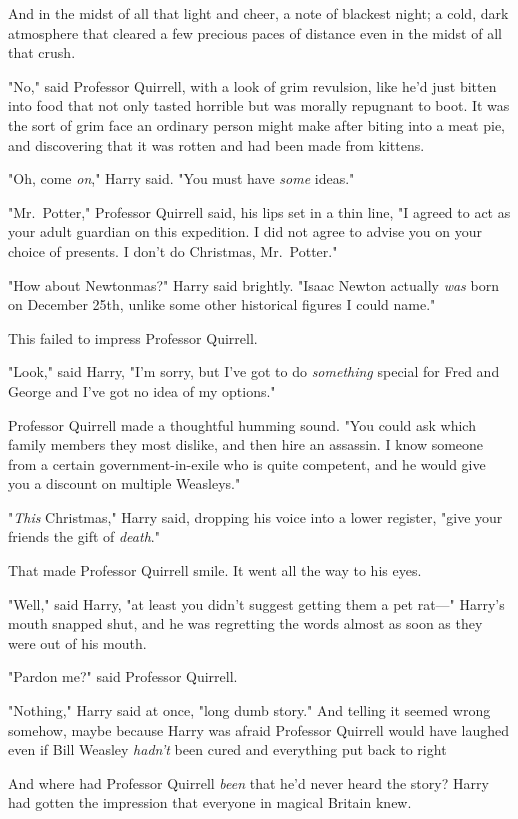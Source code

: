 And in the midst of all that light and cheer, a note of blackest night; a cold,
dark atmosphere that cleared a few precious paces of distance even in the midst
of all that crush.

"No," said Professor Quirrell, with a look of grim revulsion, like he'd just
bitten into food that not only tasted horrible but was morally repugnant to
boot. It was the sort of grim face an ordinary person might make after biting
into a meat pie, and discovering that it was rotten and had been made from
kittens.

"Oh, come \emph{on}," Harry said. "You must have \emph{some} ideas."

"Mr.~Potter," Professor Quirrell said, his lips set in a thin line, "I agreed
to act as your adult guardian on this expedition. I did not agree to advise you
on your choice of presents. I don't do Christmas, Mr.~Potter."

"How about Newtonmas?" Harry said brightly. "Isaac Newton actually \emph{was}
born on December 25th, unlike some other historical figures I could name."

This failed to impress Professor Quirrell.

"Look," said Harry, "I'm sorry, but I've got to do \emph{something} special for
Fred and George and I've got no idea of my options."

Professor Quirrell made a thoughtful humming sound. "You could ask which family
members they most dislike, and then hire an assassin. I know someone from a
certain government-in-exile who is quite competent, and he would give you a
discount on multiple Weasleys."

"\emph{This} Christmas," Harry said, dropping his voice into a lower register,
"give your friends the gift{\el} of \emph{death}."

That made Professor Quirrell smile. It went all the way to his eyes.

"Well," said Harry, "at least you didn't suggest getting them a pet rat—"
Harry's mouth snapped shut, and he was regretting the words almost as soon as
they were out of his mouth.

"Pardon me?" said Professor Quirrell.

"Nothing," Harry said at once, "long dumb story." And telling it seemed wrong
somehow, maybe because Harry was afraid Professor Quirrell would have laughed
even if Bill Weasley \emph{hadn't} been cured and everything put back to
right{\el}

And where had Professor Quirrell \emph{been} that he'd never heard the story?
Harry had gotten the impression that everyone in magical Britain knew.

